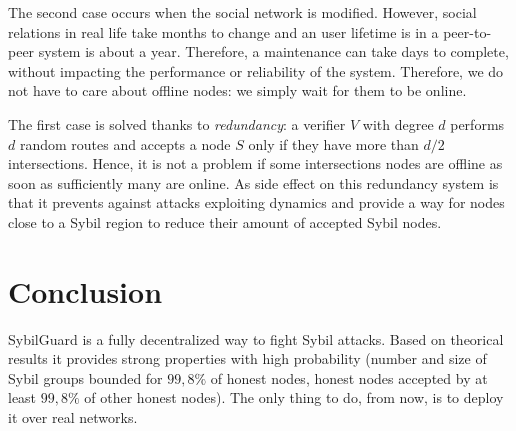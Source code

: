 \documentclass[a4paper,11pt]{article}
\begin{document}
The second case occurs when the social network is modified. However,
social relations in real life take months to change and an user
lifetime is in a peer-to-peer system is about a year. Therefore, a
maintenance can take days to complete, without impacting the
performance or reliability of the system. Therefore, we do not have to
care about offline nodes: we simply wait for them to be online.

The first case is solved thanks to \emph{redundancy}: a verifier $V$
with degree $d$ performs $d$ random routes and accepts a node $S$ only
if they have more than $d/2$ intersections.  Hence, it is not a
problem if some intersections nodes are offline as soon as
sufficiently many are online. As side effect on this redundancy system
is that it prevents against attacks exploiting dynamics and provide a
way for nodes close to a Sybil region to reduce their amount of
accepted Sybil nodes.

\section*{Conclusion}




SybilGuard is a fully decentralized way to fight Sybil attacks.  Based
on theorical results it provides strong properties with high
probability (number and size of Sybil groups bounded for $99,8\%$ of
honest nodes, honest nodes accepted by at least $99,8\%$ of other
honest nodes).  The only thing to do, from now, is to deploy it over
real networks.





{}

\end{document}
